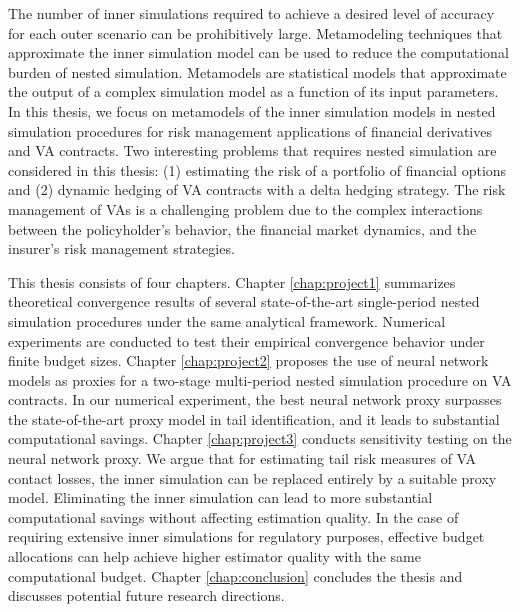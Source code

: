 The number of inner simulations required to achieve a desired level of accuracy for each outer scenario can be prohibitively large.
Metamodeling techniques that approximate the inner simulation model can be used to reduce the computational burden of nested simulation.
Metamodels are statistical models that approximate the output of a complex simulation model as a function of its input parameters.
In this thesis, we focus on metamodels of the inner simulation models in nested simulation procedures for risk management applications of financial derivatives and VA contracts.
Two interesting problems that requires nested simulation are considered in this thesis: (1) estimating the risk of a portfolio of financial options and (2) dynamic hedging of VA contracts with a delta hedging strategy.
The risk management of VAs is a challenging problem due to the complex interactions between the policyholder's behavior, the financial market dynamics, and the insurer's risk management strategies.

This thesis consists of four chapters. Chapter \ref{chap:project1} summarizes theoretical convergence results of several state-of-the-art single-period nested simulation procedures under the same analytical framework. Numerical experiments are conducted to test their empirical convergence behavior under finite budget sizes.
Chapter \ref{chap:project2} proposes the use of neural network models as proxies for a two-stage multi-period nested simulation procedure on VA contracts. 
In our numerical experiment, the best neural network proxy surpasses the state-of-the-art proxy model in tail identification, and it leads to substantial computational savings. 
Chapter \ref{chap:project3} conducts sensitivity testing on the neural network proxy. We argue that for estimating tail risk measures of VA contact losses, the inner simulation can be replaced entirely by a suitable proxy model. 
Eliminating the inner simulation can lead to more substantial computational savings without affecting estimation quality. 
In the case of requiring extensive inner simulations for regulatory purposes, effective budget allocations can help achieve higher estimator quality with the same computational budget.
Chapter \ref{chap:conclusion} concludes the thesis and discusses potential future research directions.

